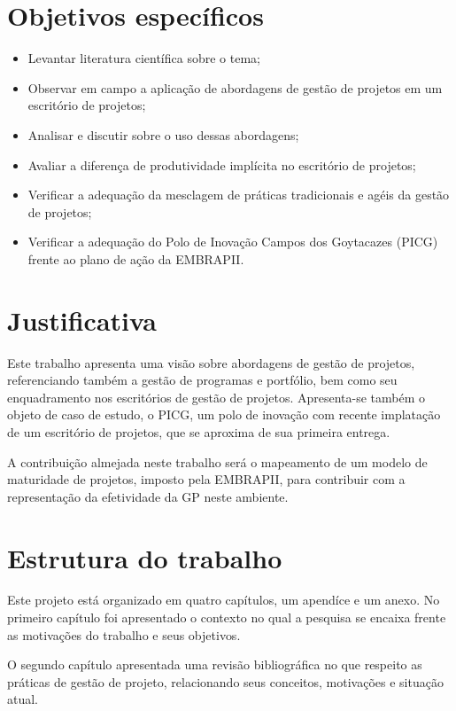 \section{Objetivos específicos}

\begin{itemize}
  \item{Levantar literatura científica sobre o tema;}
  \item{Observar em campo a aplicação de abordagens de gestão de projetos em um escritório de projetos;}
  \item{Analisar e discutir sobre o uso dessas abordagens;}
  \item{Avaliar a diferença de produtividade implícita no escritório de projetos;}
  \item{Verificar a adequação da mesclagem de práticas tradicionais e agéis da gestão de projetos;}
  \item{Verificar a adequação do Polo de Inovação Campos dos Goytacazes (PICG) frente ao plano de ação da EMBRAPII.}
\end{itemize}


\section{Justificativa}

Este trabalho apresenta uma visão sobre abordagens de gestão de projetos, referenciando também a gestão de programas e portfólio, bem como seu enquadramento nos escritórios de gestão de projetos. Apresenta-se também o objeto de caso de estudo, o PICG, um polo de inovação com recente implatação de um escritório de projetos, que se aproxima de sua primeira entrega.

A contribuição almejada neste trabalho será o mapeamento de um modelo de maturidade de projetos, imposto pela EMBRAPII, para contribuir com a representação da efetividade da GP neste ambiente.

\section{Estrutura do trabalho}

Este projeto está organizado em quatro capítulos, um apendíce e um anexo. No primeiro capítulo foi apresentado o contexto no qual a pesquisa se encaixa frente as motivações do trabalho e seus objetivos.

O segundo capítulo apresentada uma revisão bibliográfica no que respeito as práticas de gestão de projeto, relacionando seus conceitos, motivações e situação atual.

